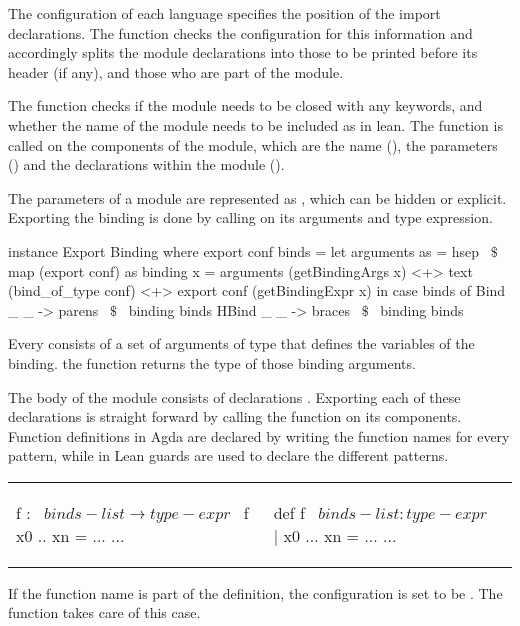 The configuration of each language specifies the position of the import declarations. The function  checks the configuration for this information and accordingly splits the module declarations into those to be printed before its header (if any), and those who are part of the module. 

The   function checks if the module needs to be closed with any keywords, and whether the name of the module needs to be included as in lean. The  function is called on the components of the module, which are the name (), the parameters () and the declarations within the module (). 

The parameters of a module are represented as \lstmath{[Binding]}, which can be hidden or explicit. Exporting the binding is done by calling  on its arguments and type expression.  
\begin{hscode}
instance Export Binding where
  export conf binds =
    let arguments as = hsep ~$\$$~ map (export conf) as
        binding x =  
          arguments (getBindingArgs x) <+> text (bind_of_type conf) 
          <+> export conf (getBindingExpr x)
    in case binds of
      Bind  _ _ -> parens ~$\$$~ binding binds
      HBind _ _ -> braces ~$\$$~ binding binds

\end{hscode}
Every  consists of a set of arguments of type  that defines the variables of the binding. the function  returns the type of those binding arguments. 

The body of the module consists of declarations \lstmath{[Decl]}. Exporting each of these declarations is straight forward by calling the  function on its components. Function definitions in Agda are declared by writing the function names for every pattern, while in Lean guards are used to declare the different patterns. 
\newline
\begin{tabular}{p{18em} p{10em}}
\begin{agdacode} 
f : ~$binds-list \to type-expr$~   
f x0 .. xn = ... 
...    
\end{agdacode}  
&
\begin{leancode}
def f ~$binds-list : type-expr$~ 
| x0 ... xn = ... 
... 
\end{leancode}
\end{tabular}
\newline
If the function name is part of the definition, the configuration is set to be . The function  takes care of this case. 

